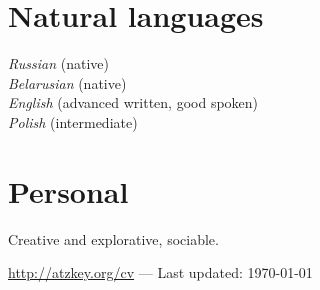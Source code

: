 \documentclass[12pt, a4paper]{article}
\begin{document}
	\section*{Natural languages}
	\textit{Russian} (native)\\
	\textit{Belarusian} (native)\\
	\textit{English} (advanced written, good spoken)\\
	\textit{Polish} (intermediate)

	\section*{Personal}
	Creative and explorative, sociable.

	\vfill{}
	\hrulefill
	\begin{center}
		\footnotesize \href{http://atzkey.org/cv}{http://atzkey.org/cv} — Last updated: \today
	\end{center}
\end{document}
